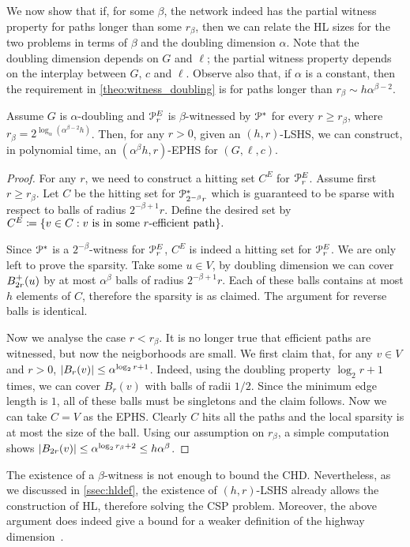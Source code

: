 We now show that if, for some $\beta$, the network indeed has the partial witness property for paths longer than some $r_\beta$, then we can relate the HL sizes for the two problems in terms of $\beta$ and the doubling dimension $\alpha$. 
Note that the doubling dimension depends on $G$ and $\ell$; the partial witness property depends on the interplay between $G$, $c$ and $\ell$.
Observe also that, if $\alpha$ is a constant, then the requirement in \cref{theo:witness_doubling} is for paths longer than $r_\beta\sim h\alpha^{\beta-2}$.
\begin{theorem}\label{theo:witness_doubling}
Assume $G$ is $\alpha$-doubling and $\mathcal{P}^E_r$ is $\beta$-witnessed by $\mathcal{P}^*$ for every $r\geq r_\beta$, where $r_\beta=2^{\log_\alpha(\alpha^{\beta-2} h)}$. 
Then, for any $r>0$, given an $(h,r)$-LSHS, we can construct, in polynomial time, an $(\alpha^{\beta} h,r)$-EPHS for $(G,\ell,c)$. 
\end{theorem}

\begin{proof}
For any $r$, we need to construct a hitting set $C^E$ for $\mathcal{P}^E_r$.
Assume first $r\geq r_\beta$.
Let $C$ be the hitting set for $\mathcal{P}^*_{2^{-\beta}r}$ which is guaranteed to be sparse with respect to balls of radius $2^{-\beta+1}r$.
Define the desired set by
$
C^E\coloneqq\{v\in C: v \text{ is in some $r$-efficient path} \}.
$

Since $\mathcal{P}^*$ is a $2^{-\beta}$-witness for $\mathcal{P}^E_r$, $C^E$ is indeed a hitting set for $\mathcal{P}^E_r$.
We are only left to prove the sparsity.
Take some $u\in V$, by doubling dimension we can cover $B^+_{2r}(u)$ by at most $\alpha^\beta$ balls of radius $2^{-\beta+1}r$.
Each of these balls contains at most $h$ elements of $C$, therefore the sparsity is as claimed.
The argument for reverse balls is identical.

Now we analyse the case $r< r_\beta$.
It is no longer true that efficient paths are witnessed, but now the neigborhoods are small.
We first claim that, for any $v\in V$ and $r>0$, $\lvert B_{r}(v)\rvert\leq \alpha^{\log_2r+1}$.
Indeed, using the doubling property $\log_2r+1$ times, we can cover $B_r(v)$ with balls of radii $1/2$.
Since the minimum edge length is $1$, all of these balls must be singletons and the claim follows.
Now we can take $C=V$ as the EPHS.
Clearly $C$ hits all the paths and the local sparsity is at most the size of the ball.
Using our assumption on $r_\beta$, a simple computation shows $\lvert B_{2r}(v)\rvert\leq \alpha^{\log_2r_\beta+2}\leq h\alpha^\beta$. 
\end{proof}
\begin{remark}
The existence of a $\beta$-witness is not enough to bound the CHD. 
Nevertheless, as we discussed in \cref{ssec:hldef}, the existence of $(h,r)$-LSHS already allows the construction of HL, therefore solving the CSP problem. 
Moreover, the above argument does indeed give a bound for a weaker definition of the highway dimension~\citep{highway2010}.
\end{remark}